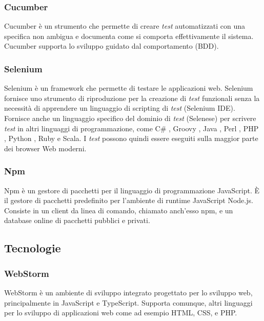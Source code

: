 \subsubsection*{Cucumber}
Cucumber è un strumento che permette di creare \emph{test} automatizzati con una specifica non ambigua e documenta come si comporta effettivamente il sistema. Cucumber supporta lo sviluppo guidato dal comportamento (BDD).

\subsubsection*{Selenium}
Selenium è un framework che permette di testare le applicazioni web. Selenium fornisce uno strumento di riproduzione per la creazione di \emph{test} funzionali senza la necessità di apprendere un linguaggio di scripting di \emph{test} (Selenium IDE). Fornisce anche un linguaggio specifico del dominio di \emph{test} (Selenese) per scrivere \emph{test} in altri linguaggi di programmazione, come C\# , Groovy , Java , Perl , PHP , Python , Ruby e Scala. I \emph{test} possono quindi essere eseguiti sulla maggior parte dei browser Web moderni.

\subsubsection*{Npm}
 Npm è un gestore di pacchetti per il linguaggio di programmazione JavaScript. È il gestore di pacchetti predefinito per l'ambiente di runtime JavaScript Node.js. Consiste in un client da linea di comando, chiamato anch'esso npm, e un database online di pacchetti pubblici e privati.


\subsection{Tecnologie}

\subsubsection*{WebStorm}
WebStorm è un ambiente di sviluppo integrato progettato per lo sviluppo web, principalmente in JavaScript e TypeScript. Supporta comunque, altri linguaggi per lo sviluppo di applicazioni web come ad esempio HTML, CSS, e PHP.

